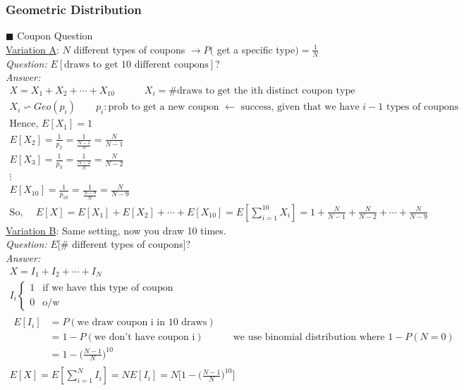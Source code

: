 \subsubsection*{Geometric Distribution}
\begin{example}
$\blacksquare$ Coupon Question\\
\underline{Variation A}: $N$ different types of coupons $\rightarrow P($ get a specific type$) = \frac{1}{N}$\\
\textit{Question:} $E[\text{draws to get 10 different coupons}]$?\\ 
\textit{Answer:}
\begin{gather*}
	X = X_1 + X_2 + \cdots + X_{10} \quad \quad \quad X_i = \text{\# draws to get the ith distinct coupon type}\\
	\boxed{X_i \backsim Geo(p_i)} \quad \quad p_i: \text{prob to get a new coupon $\leftarrow$ success, given that we have $i-1$ types of coupons}\\
	\text{Hence, } E[X_1] = 1\\
	E[X_2] = \frac{1}{p_2} = \frac{1}{\frac{N-1}{N}} = \frac{N}{N-1}\\
	E[X_3] = \frac{1}{p_3} = \frac{1}{\frac{N-2}{N}} = \frac{N}{N-2}\\
	\vdots\\
	E[X_{10}] = \frac{1}{p_{10}} = \frac{1}{\frac{N-9}{N}} = \frac{N}{N-9}\\
	\text{So, } \quad E[X] = E[X_1] + E[X_2] + \cdots + E[X_{10}] = E[\sum\limits_{i=1}^{10} X_i] = 1 + \frac{N}{N-1} + \frac{N}{N-2} + \cdots + \frac{N}{N-9}
\end{gather*}
\underline{Variation B}: Same setting, now you draw 10 times.\\
\textit{Question:} $E[\#$ different types of coupons$]$?\\ 
\textit{Answer:}
\begin{gather*}
	X = I_1 + I_2 + \cdots + I_N\\
	I_i
	\begin{cases}
		1 & \text{if we have this type of coupon}\\
		0 & \text{o/w}
	\end{cases}\\
	\begin{align*}
		E[I_i]  & = P(\text{we draw coupon i in 10 draws})\\
		& = 1 - P(\text{we don't have coupon i}) \quad \quad \quad \text{we use binomial distribution where } 1-P(N=0)\\
		& = 1 - \bigg( \frac{N-1}{N} \bigg)^{10}
	\end{align*}\\
	E[X] = E[\sum\limits_{i=1}^{N} I_i] = N E[I_i] = \boxed{N \bigg[ 1 - \bigg( \frac{N-1}{N} \bigg)^{10} \bigg]}
\end{gather*}
\end{example}
